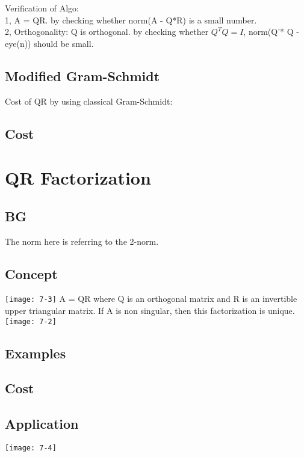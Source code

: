 \documentclass{article}
\begin{document}
\noindent
Verification of Algo:\\
1, A = QR. by checking whether norm(A - Q*R) is a small number.\\
2, Orthogonality: Q is orthogonal. by checking whether $Q^TQ = I$, norm(Q'* Q - eye(n)) should be small.

\subsection{Modified Gram-Schmidt}

Cost of QR by using classical Gram-Schmidt:\\


\subsection*{Cost}



\pagebreak
\section{QR Factorization}
\subsection{BG}
The norm here is referring to the 2-norm.\\
\subsection*{Concept}
\texttt{[image: 7-3]}
A = QR where Q is an orthogonal matrix and R is an invertible upper triangular matrix. If A is
non singular, then this factorization is unique.\\
\noindent
\texttt{[image: 7-2]}\\


\subsection*{Examples}
\subsection*{Cost}
\subsection*{Application}
\texttt{[image: 7-4]}\\
\end{document}
